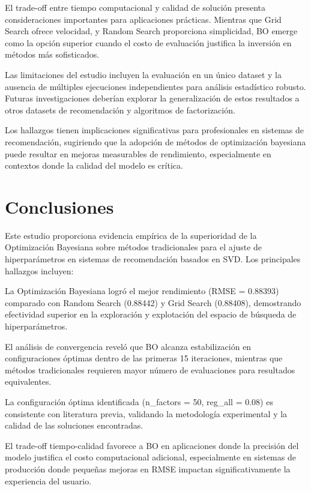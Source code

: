 \documentclass[conference]{IEEEtran}
\begin{document}
El trade-off entre tiempo computacional y calidad de solución presenta consideraciones importantes para aplicaciones prácticas. Mientras que Grid Search ofrece velocidad, y Random Search proporciona simplicidad, BO emerge como la opción superior cuando el costo de evaluación justifica la inversión en métodos más sofisticados.

Las limitaciones del estudio incluyen la evaluación en un único dataset y la ausencia de múltiples ejecuciones independientes para análisis estadístico robusto. Futuras investigaciones deberían explorar la generalización de estos resultados a otros datasets de recomendación y algoritmos de factorización.

Los hallazgos tienen implicaciones significativas para profesionales en sistemas de recomendación, sugiriendo que la adopción de métodos de optimización bayesiana puede resultar en mejoras measurables de rendimiento, especialmente en contextos donde la calidad del modelo es crítica.

\section{Conclusiones}

Este estudio proporciona evidencia empírica de la superioridad de la Optimización Bayesiana sobre métodos tradicionales para el ajuste de hiperparámetros en sistemas de recomendación basados en SVD. Los principales hallazgos incluyen:

La Optimización Bayesiana logró el mejor rendimiento (RMSE = 0.88393) comparado con Random Search (0.88442) y Grid Search (0.88408), demostrando efectividad superior en la exploración y explotación del espacio de búsqueda de hiperparámetros.

El análisis de convergencia reveló que BO alcanza estabilización en configuraciones óptimas dentro de las primeras 15 iteraciones, mientras que métodos tradicionales requieren mayor número de evaluaciones para resultados equivalentes.

La configuración óptima identificada (n\_factors = 50, reg\_all = 0.08) es consistente con literatura previa, validando la metodología experimental y la calidad de las soluciones encontradas.

El trade-off tiempo-calidad favorece a BO en aplicaciones donde la precisión del modelo justifica el costo computacional adicional, especialmente en sistemas de producción donde pequeñas mejoras en RMSE impactan significativamente la experiencia del usuario.
\end{document}
